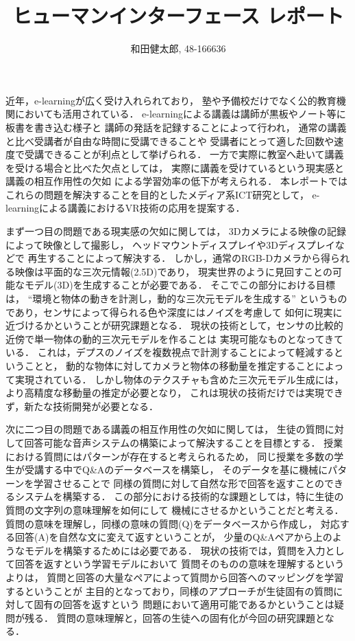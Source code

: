 \documentclass[letterpaper, 12 pt, conference, onecolumn]{ieeeconf}  %
\title{\LARGE \bf
ヒューマンインターフェース レポート
}
\author{和田健太郎, 48-166636}
\begin{document}
\maketitle
\thispagestyle{empty}
\pagestyle{empty}



近年，e-learningが広く受け入れられており，
塾や予備校だけでなく公的教育機関においても活用されている．
e-learningによる講義は講師が黒板やノート等に板書を書き込む様子と
講師の発話を記録することによって行われ，
通常の講義と比べ受講者が自由な時間に受講できることや
受講者にとって適した回数や速度で受講できることが利点として挙げられる．
一方で実際に教室へ赴いて講義を受ける場合と比べた欠点としては，
実際に講義を受けているという現実感と講義の相互作用性の欠如
による学習効率の低下が考えられる．
本レポートではこれらの問題を解決することを目的としたメディア系ICT研究として，
e-learningによる講義におけるVR技術の応用を提案する．

まず一つ目の問題である現実感の欠如に関しては，
3Dカメラによる映像の記録によって映像として撮影し，
ヘッドマウントディスプレイや3Dディスプレイなどで
再生することによって解決する．
しかし，通常のRGB-Dカメラから得られる映像は平面的な三次元情報(2.5D)であり，
現実世界のように見回すことの可能なモデル(3D)を生成することが必要である．
そこでこの部分における目標は，
``環境と物体の動きを計測し，動的な三次元モデルを生成する''
というものであり，センサによって得られる色や深度にはノイズを考慮して
如何に現実に近づけるかということが研究課題となる．
現状の技術として，センサの比較的近傍で単一物体の動的三次元モデルを作ることは
実現可能なものとなってきている．
これは，デプスのノイズを複数視点で計測することによって軽減するということと，
動的な物体に対してカメラと物体の移動量を推定することによって実現されている．
しかし物体のテクスチャも含めた三次元モデル生成には，
より高精度な移動量の推定が必要となり，
これは現状の技術だけでは実現できず，新たな技術開発が必要となる．

次に二つ目の問題である講義の相互作用性の欠如に関しては，
生徒の質問に対して回答可能な音声システムの構築によって解決することを目標とする．
授業における質問にはパターンが存在すると考えられるため，
同じ授業を多数の学生が受講する中でQ\&Aのデータベースを構築し，
そのデータを基に機械にパターンを学習させることで
同様の質問に対して自然な形で回答を返すことのできるシステムを構築する．
この部分における技術的な課題としては，特に生徒の質問の文字列の意味理解を如何にして
機械にさせるかということだと考える．
質問の意味を理解し，同様の意味の質問(Q)をデータベースから作成し，
対応する回答(A)を自然な文に変えて返すということが，
少量のQ\&Aペアから上のようなモデルを構築するためには必要である．
現状の技術では，質問を入力として回答を返すという学習モデルにおいて
質問そのものの意味を理解するというよりは，
質問と回答の大量なペアによって質問から回答へのマッピングを学習するということが
主目的となっており，同様のアプローチが生徒固有の質問に対して固有の回答を返すという
問題において適用可能であるかということは疑問が残る．
質問の意味理解と，回答の生徒への固有化が今回の研究課題となる．
\end{document}
